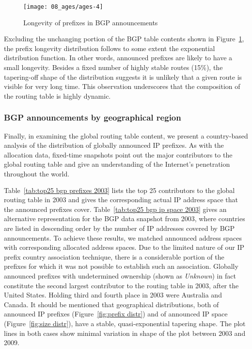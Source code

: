 \begin{figure}[htbp]
	\centering
		\texttt{[image: 08\_ages/ages-4]}
	\caption{Longevity of prefixes in BGP announcements}
	\label{fig:bgp ages}
\end{figure}

Excluding the unchanging portion of the BGP table contents shown in
Figure~\ref{fig:bgp ages}, the prefix longevity distribution follows to some
extent the exponential distribution function. In other words, announced
prefixes are likely to have a small longevity.  Besides a fixed number of
highly stable routes (15\%), the tapering-off shape of the distribution
suggests it is unlikely that a given route is visible for very long time. This
observation underscores that the composition of the routing table is highly
dynamic.

\subsubsection{BGP announcements by geographical region}

Finally, in examining the global routing table content, we present a
country-based analysis of the distribution of globally announced IP prefixes.
As with the allocation data, fixed-time snapshots point out the major
contributors to the global routing table and give an understanding of the
Internet's penetration throughout the world.

Table~\ref{tab:top25 bgp prefixes 2003} lists the top 25 contributors to the
global routing table in 2003 and gives the corresponding actual IP address
space that the announced prefixes cover. Table~\ref{tab:top25 bgp ip space
2003} gives an alternative representation for the BGP data snapshot from 2003,
where countries are listed in descending order by the number of IP addresses
covered by BGP announcements. To achieve these results, we matched announced
address spaces with corresponding allocated address spaces.  Due to the limited
nature of our IP prefix country association technique, there is a considerable
portion of the prefixes for which it was not possible to establish such an
association. Globally announced prefixes with undetermined ownership (shown as
\emph{Unknown}) in fact constitute the second largest contributor to the
routing table in 2003, after the United States. Holding third and fourth place
in 2003 were Australia and Canada. It should be mentioned that geographical
distributions, both of announced IP prefixes (Figure~\ref{fig:prefix distr})
and of announced IP space (Figure~\ref{fig:size distr}), have a stable,
quasi-exponential tapering shape.  The plot lines in both cases show minimal
variation in shape of the plot between 2003 and 2009.

